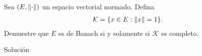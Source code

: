 \begin{homeworkProblem}
  Sea $(E,\lVert\cdot\rVert)$ un espacio vectorial normado. Defina
  \begin{align*}
    \mathcal{K}=\{x\in E:\lVert x\rVert=1\}.
  \end{align*}
  Demuestre que $E$ es de Banach si y solamente si $\mathcal{K}$ es completo. 
  \begin{solution}
    Solución
  \end{solution}
\end{homeworkProblem}
